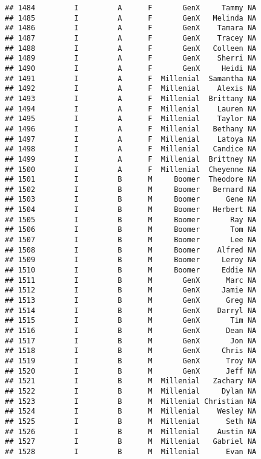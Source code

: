 \documentclass[
]{article}
\begin{document}
\begin{verbatim}
## 1484         I         A      F       GenX     Tammy NA
## 1485         I         A      F       GenX   Melinda NA
## 1486         I         A      F       GenX    Tamara NA
## 1487         I         A      F       GenX    Tracey NA
## 1488         I         A      F       GenX   Colleen NA
## 1489         I         A      F       GenX    Sherri NA
## 1490         I         A      F       GenX     Heidi NA
## 1491         I         A      F  Millenial  Samantha NA
## 1492         I         A      F  Millenial    Alexis NA
## 1493         I         A      F  Millenial  Brittany NA
## 1494         I         A      F  Millenial    Lauren NA
## 1495         I         A      F  Millenial    Taylor NA
## 1496         I         A      F  Millenial   Bethany NA
## 1497         I         A      F  Millenial    Latoya NA
## 1498         I         A      F  Millenial   Candice NA
## 1499         I         A      F  Millenial  Brittney NA
## 1500         I         A      F  Millenial  Cheyenne NA
## 1501         I         B      M     Boomer  Theodore NA
## 1502         I         B      M     Boomer   Bernard NA
## 1503         I         B      M     Boomer      Gene NA
## 1504         I         B      M     Boomer   Herbert NA
## 1505         I         B      M     Boomer       Ray NA
## 1506         I         B      M     Boomer       Tom NA
## 1507         I         B      M     Boomer       Lee NA
## 1508         I         B      M     Boomer    Alfred NA
## 1509         I         B      M     Boomer     Leroy NA
## 1510         I         B      M     Boomer     Eddie NA
## 1511         I         B      M       GenX      Marc NA
## 1512         I         B      M       GenX     Jamie NA
## 1513         I         B      M       GenX      Greg NA
## 1514         I         B      M       GenX    Darryl NA
## 1515         I         B      M       GenX       Tim NA
## 1516         I         B      M       GenX      Dean NA
## 1517         I         B      M       GenX       Jon NA
## 1518         I         B      M       GenX     Chris NA
## 1519         I         B      M       GenX      Troy NA
## 1520         I         B      M       GenX      Jeff NA
## 1521         I         B      M  Millenial   Zachary NA
## 1522         I         B      M  Millenial     Dylan NA
## 1523         I         B      M  Millenial Christian NA
## 1524         I         B      M  Millenial    Wesley NA
## 1525         I         B      M  Millenial      Seth NA
## 1526         I         B      M  Millenial    Austin NA
## 1527         I         B      M  Millenial   Gabriel NA
## 1528         I         B      M  Millenial      Evan NA

\end{verbatim}
\end{document}
